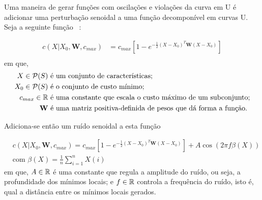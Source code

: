 Uma maneira de gerar funções com oscilações e violações da curva em U
é adicionar uma perturbação senoidal a uma função decomponível em curvas
U. Seja a seguinte função ~\cite{AG+18}:

\begin{align*}
    c(X | X_0, {\mathbf W}, c_{max}) &= c_{max} [1 - e^{- \frac{1}{2} 
                    (X - X_0)^T {\mathbf W} (X - X_0)}] \\
\end{align*}
em que,
\begin{align*}
    X \in \mathcal{P}(S) & \text{ é um conjunto de características;} \\
    X_0 \in \mathcal{P} (S) & \text{ é o conjunto de custo mínimo;} \\
    c_{max} \in \mathbb{R} & \text{ é uma constante que escala o custo máximo de um subconjunto;} \\
    {\mathbf W} & \text { é uma matriz positiva-definida de pesos que dá forma a função.}
\end{align*}

Adiciona-se então um ruído senoidal a esta função

\begin{align*}
    & c(X | X_0, {\mathbf W}, c_{max}) = c_{max} [1 - e^{- \frac{1}{2} 
                    (X - X_0)^T {\mathbf W} (X - X_0)}]  + 
                    A \cos (2\pi f \beta (X)) \\
    & \text{com } \beta (X) = \frac{1}{n} \sum_{i = 1}^{n} X (i)
\end{align*}
em que, $A \in \mathbb{R}$ é uma constante que regula a amplitude do ruído, 
ou seja, a profundidade dos mínimos locais; e $f \in \mathbb{R}$ controla a
frequência do ruído, isto é, qual a distância entre os mínimos locais 
gerados.



